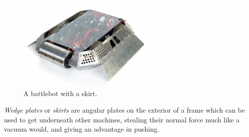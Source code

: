 \begin{figure}[H]
	\includegraphics[width=0.6\textwidth]{imgs/drivetrain_skirt.jpeg}
	\caption{A battlebot with a skirt.}
\end{figure}

\textit{Wedge plates} or \textit{skirts} are angular plates on the exterior of a frame which can be used to get underneath other machines, stealing their normal force much like a vacuum would, and giving an advantage in pushing.